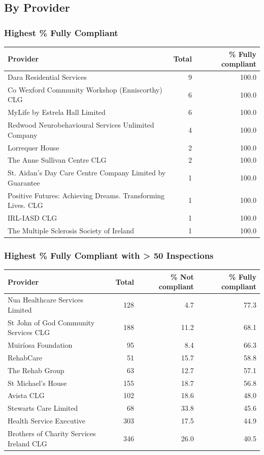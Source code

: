 \documentclass[a4paper,11pt,twoside]{article}
\begin{document}
\subsection{By Provider}
\label{sec:orgbba8fec}

\subsubsection{Highest \% Fully Compliant}
\label{sec:org1956a71}
\begin{center}
\begin{tabular}{lrr}
Provider & Total & \% Fully compliant\\[0pt]
\hline
Dara Residential Services & 9 & 100.0\\[0pt]
Co Wexford Community Workshop (Enniscorthy) CLG & 6 & 100.0\\[0pt]
MyLife by Estrela Hall Limited & 6 & 100.0\\[0pt]
Redwood Neurobehavioural Services Unlimited Company & 4 & 100.0\\[0pt]
Lorrequer House & 2 & 100.0\\[0pt]
The Anne Sullivan Centre CLG & 2 & 100.0\\[0pt]
St. Aidan's Day Care Centre Company Limited by Guarantee & 1 & 100.0\\[0pt]
Positive Futures: Achieving Dreams. Transforming Lives. CLG & 1 & 100.0\\[0pt]
IRL-IASD CLG & 1 & 100.0\\[0pt]
The Multiple Sclerosis Society of Ireland & 1 & 100.0\\[0pt]
\end{tabular}
\end{center}
\subsubsection{Highest \% Fully Compliant with > 50 Inspections}
\label{sec:orgffc61ab}

\begin{center}
\begin{tabular}{lrrr}
Provider & Total & \% Not compliant & \% Fully compliant\\[0pt]
\hline
Nua Healthcare Services Limited & 128 & 4.7 & 77.3\\[0pt]
St John of God Community Services CLG & 188 & 11.2 & 68.1\\[0pt]
Muiríosa Foundation & 95 & 8.4 & 66.3\\[0pt]
RehabCare & 51 & 15.7 & 58.8\\[0pt]
The Rehab Group & 63 & 12.7 & 57.1\\[0pt]
St Michael's House & 155 & 18.7 & 56.8\\[0pt]
Avista CLG & 102 & 18.6 & 48.0\\[0pt]
Stewarts Care Limited & 68 & 33.8 & 45.6\\[0pt]
Health Service Executive & 303 & 17.5 & 44.9\\[0pt]
Brothers of Charity Services Ireland CLG & 346 & 26.0 & 40.5\\[0pt]
\end{tabular}
\end{center}
\end{document}
